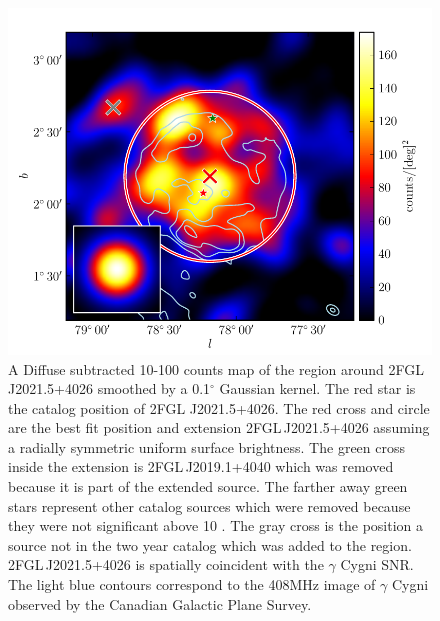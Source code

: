 \documentclass[12pt,preprint]{aastex}
\newcommand{\gev}{\text{GeV}\xspace}
\renewcommand{\deg}{\ensuremath{^\circ}\xspace}
\begin{document}
\begin{figure}
  \begin{center}
    \includegraphics[type=pdf,ext=.pdf,read=.pdf]{source_plots/source_Gamma_Cygni}
  \end{center}
  \caption{A Diffuse subtracted 10-100 \gev counts map of the region
  around 2FGL\,J2021.5+4026 smoothed by a 0.1\deg Gaussian kernel. The
  red star is the catalog position of 2FGL J2021.5+4026.  The red cross
  and circle are the best fit position and extension 2FGL\,J2021.5+4026
  assuming a radially symmetric uniform surface brightness.  The green
  cross inside the extension is 2FGL\,J2019.1+4040 which was removed
  because it is part of the extended source.  The farther away green
  stars represent other catalog sources which were removed because
  they were not significant above 10 \gev.  The gray cross is the
  position a source not in the two year catalog which was added to the
  region. 2FGL\,J2021.5+4026 is spatially coincident with the $\gamma$
  Cygni SNR.  The light blue contours correspond to the 408MHz image of
  $\gamma$ Cygni observed by the Canadian Galactic Plane Survey.
  }\label{1FGL_J2020.0+4049}
\end{figure}
\end{document}
